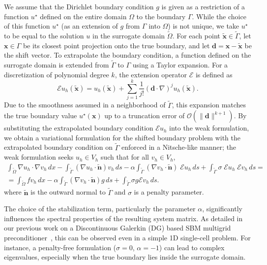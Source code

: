 \documentclass{elsarticle}
\begin{document}
We assume that the Dirichlet boundary condition $g$ is given as a restriction of a function $u^\star$ defined on the
entire domain $\Omega$ to the boundary $\Gamma$. While the choice of this function $u^\star$ (as an extension of $g$
from $\Gamma$ into $\Omega$) is not unique, we take $u^\star$ to be equal to the solution $u$ in the surrogate domain
$\tilde{\Omega}$. For each point $\tilde{\mathbf{x}} \in \tilde{\Gamma}$, let $\mathbf{x} \in \Gamma$ be its closest
point projection onto the true boundary, and let $\mathbf{d} = \mathbf{x} - \tilde{\mathbf{x}}$ be the shift vector. To
extrapolate the boundary condition, a function defined on the surrogate domain is extended from $\tilde{\Gamma}$ to
$\Gamma$ using a Taylor expansion. For a discretization of polynomial degree $k$, the extension operator $\mathcal{E}$
is defined as
\[
    \mathcal{E}u_h(\tilde{\mathbf{x}}) = u_h(\tilde{\mathbf{x}}) + \sum_{j=1}^k \frac{1}{j!} (\mathbf{d} \cdot \nabla)^j u_h (\tilde{\mathbf{x}}).
\]
Due to the smoothness assumed in a neighborhood of $\tilde{\Gamma}$, this expansion matches the true boundary value
$u^\star(\mathbf{x})$ up to a truncation error of $\mathcal{O}(\|\mathbf{d}\|^{k+1})$. By substituting the extrapolated
boundary condition $\mathcal{E}u_h$ into the weak formulation, we obtain a variational formulation for the shifted
boundary problem with the extrapolated boundary condition on $\tilde{\Gamma}$ enforced in a Nitsche-like manner; the
weak formulation seeks $u_h \in V_h$ such that for all $v_h \in V_h$,
\begin{equation}
    \begin{split}
        \int_{\tilde{\Omega}} \nabla u_h \cdot \nabla v_h \, dx
        - \int_{\tilde{\Gamma}} (\nabla u_h \cdot \tilde{\mathbf{n}}) v_h \, ds
        - \alpha \int_{\tilde{\Gamma}} (\nabla v_h \cdot \tilde{\mathbf{n}}) \; \mathcal{E}u_h \, ds
        + \int_{\tilde{\Gamma}} \sigma \; \mathcal{E} u_h  \; \mathcal{E} v_h \, ds = \\
        = \int_{\tilde{\Omega}} f v_h \, dx
        - \alpha\int_{\tilde{\Gamma}} (\nabla v_h \cdot \tilde{\mathbf{n}}) {g} \, ds
        + \int_{\tilde{\Gamma}} \sigma g \mathcal{E} v_h \, ds.
    \end{split}
\end{equation}
where $\tilde{\mathbf{n}}$ is the outward normal to $\tilde{\Gamma}$ and $\sigma$ is a penalty parameter.

The choice of the stabilization term, particularly the parameter $\alpha$, significantly influences the spectral
properties of the resulting system matrix. As detailed in our previous work on a Discontinuous Galerkin (DG) based SBM
multigrid preconditioner~\cite{wichrowski2025geometric}, this can be observed even in a simple 1D single-cell problem.
For instance, a penalty-free formulation ($\sigma=0$, $\alpha=-1$) can lead to complex eigenvalues, especially when the
true boundary lies inside the surrogate domain.
\end{document}
